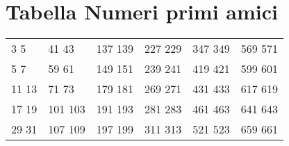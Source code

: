 \section{Tabella Numeri primi amici}
\label{sec:TabellaNumeriPrimiAmici}
\begin{center}
\footnotesize
\begin{tabular}{llllll}
3 5&41 43&137 139&227 229&347 349&569 571\\
5 7&59 61&149 151&239 241&419 421&599 601\\
11 13&71 73&179 181&269 271&431 433&617 619\\
17 19&101 103&191 193&281 283&461 463&641 643\\
29 31&107 109&197 199&311 313&521 523&659 661\\
\end{tabular}
\end{center}


